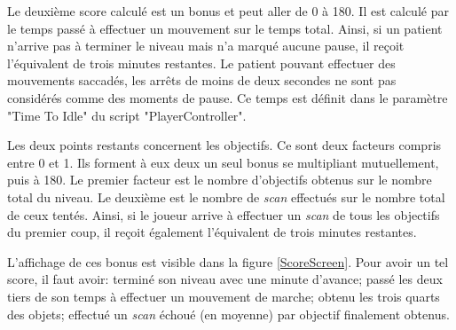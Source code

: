 		Le deuxième score calculé est un bonus et peut aller de 0 à 180. Il est calculé par le temps passé à effectuer un mouvement sur le temps total. Ainsi, si un patient n'arrive pas à terminer le niveau mais n'a marqué aucune pause, il reçoit l'équivalent de trois minutes restantes. Le patient pouvant effectuer des mouvements saccadés, les arrêts de moins de deux secondes ne sont pas considérés comme des moments de pause. Ce temps est définit dans le paramètre "Time To Idle" du script "PlayerController".
	
		Les deux points restants concernent les objectifs. Ce sont deux facteurs compris entre 0 et 1. Ils forment à eux deux un seul bonus se multipliant mutuellement, puis à 180. Le premier facteur est le nombre d'objectifs obtenus sur le nombre total du niveau. Le deuxième est le nombre de \textit{scan} effectués sur le nombre total de ceux tentés. Ainsi, si le joueur arrive à effectuer un \textit{scan} de tous les objectifs du premier coup, il reçoit également l'équivalent de trois minutes restantes.
		
		L'affichage de ces bonus est visible dans la figure \ref{ScoreScreen}. Pour avoir un tel score, il faut avoir: terminé son niveau avec une minute d'avance; passé les deux tiers de son temps à effectuer un mouvement de marche; obtenu les trois quarts des objets; effectué un \textit{scan} échoué (en moyenne) par objectif finalement obtenus.\medskip
		
		\begin{minipage}{\linewidth}
			\label{ScoreScreen}
		\end{minipage}\medskip
		\\%
		
